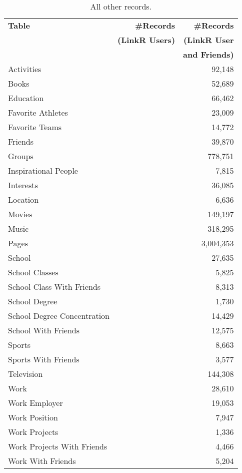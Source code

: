 \documentclass[letterpaper]{article}
\begin{document}
\begin{table}
\centering
\caption{\small All other records.}
\label{tab:all}
\begin{tabular}{|>{\small}p{2cm}|>{\small}r|>{\small}r|}
\hline
\textbf{Table} & \textbf{\#Records} & \textbf{\#Records} \\
& \textbf{(LinkR Users)} & \textbf{(LinkR User} \\
& & \textbf{and Friends)} \\
\hline
Activities &  & 92,148 \\
\hline
Books &  & 52,689 \\
\hline
Education &  & 66,462 \\
\hline
Favorite Athletes &  & 23,009 \\
\hline
Favorite Teams &  & 14,772 \\
\hline
Friends &  & 39,870 \\
\hline
Groups &  & 778,751 \\
\hline
Inspirational People &  & 7,815 \\
\hline
Interests &  & 36,085 \\
\hline
Location &  & 6,636 \\
\hline
Movies &  & 149,197 \\
\hline
Music &  & 318,295 \\
\hline
Pages &  & 3,004,353 \\
\hline
School &  & 27,635 \\
\hline
School Classes &  & 5,825 \\
\hline
School Class With Friends &  & 8,313 \\
\hline
School Degree &  & 1,730 \\
\hline
School Degree Concentration &  & 14,429 \\
\hline
School With Friends &  & 12,575 \\
\hline
Sports &  & 8,663 \\
\hline
Sports With Friends &  & 3,577 \\
\hline
Television &  & 144,308 \\
\hline
Work &  & 28,610 \\
\hline
Work Employer &  & 19,053 \\
\hline
Work Position &  & 7,947 \\
\hline
Work Projects &  & 1,336 \\
\hline
Work Projects With Friends &  & 4,466 \\
\hline
Work With Friends &  & 5,204 \\
\hline
\end{tabular}
\end{table}
\end{document}
